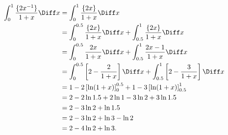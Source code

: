 \begin{enumerate}
          \begin{align*}
              \int_{0}^{1} \frac{\{2x^{-1}\}}{1 + x} \Diff x & = \int_{0}^{1} \frac{\{2x\}}{1 + x} \Diff x                                                                         \\
                                                             & = \int_{0}^{0.5} \frac{\{2x\}}{1 + x} \Diff x + \int_{0.5}^{1} \frac{\{2x\}}{1 + x} \Diff x                         \\
                                                             & = \int_{0}^{0.5} \frac{2x}{1 + x} \Diff x + \int_{0.5}^{1} \frac{2x - 1}{1 + x} \Diff x                             \\
                                                             & = \int_{0}^{0.5} \left[2 - \frac{2}{1 + x}\right] \Diff x + \int_{0.5}^{1} \left[2 - \frac{3}{1 + x}\right] \Diff x \\
                                                             & = 1 - 2 \left[\ln(1 + x)\right]_{0}^{0.5} + 1 - 3 \left[\ln(1 + x)\right]_{0.5}^{1}                                 \\
                                                             & = 2 - 2 \ln 1.5 + 2 \ln 1 - 3 \ln 2 + 3 \ln 1.5                                                                     \\
                                                             & = 2 - 3 \ln 2 + \ln 1.5                                                                                             \\
                                                             & = 2 - 3 \ln 2 + \ln 3 - \ln 2                                                                                       \\
                                                             & = 2 - 4 \ln 2 + \ln 3.
          \end{align*}
\end{enumerate}